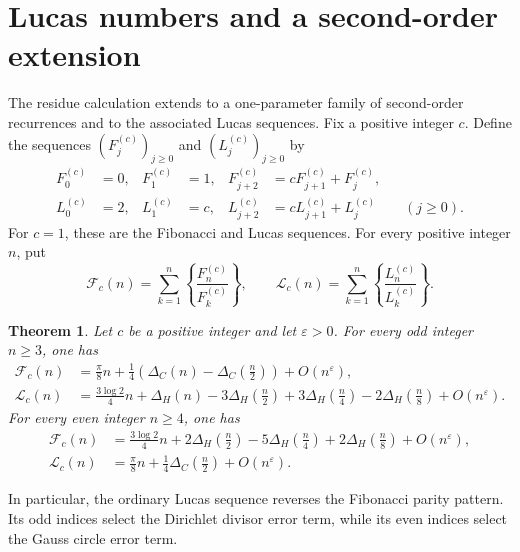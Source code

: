 \documentclass[11pt]{article}
\newtheorem{theorem}{Theorem}[section]
\newcommand{\FF}{\mathcal F}
\newcommand{\LL}{\mathcal L}
\newcommand{\eps}{\varepsilon}
\begin{document}
\section{Lucas numbers and a second-order extension}

The residue calculation extends to a one-parameter family of second-order
recurrences and to the associated Lucas sequences. Fix a positive integer
$c$. Define the sequences
$(F_j^{(c)})_{j\geq 0}$ and
$(L_j^{(c)})_{j\geq 0}$ by
\begin{align*}
 F_0^{(c)}&=0,&F_1^{(c)}&=1,&
 F_{j+2}^{(c)}&=cF_{j+1}^{(c)}+F_j^{(c)},\\
 L_0^{(c)}&=2,&L_1^{(c)}&=c,&
 L_{j+2}^{(c)}&=cL_{j+1}^{(c)}+L_j^{(c)}
 \qquad (j\geq 0).
\end{align*}
For $c=1$, these are the Fibonacci and Lucas sequences. For every positive
integer $n$, put
\[
 \FF_c(n)=\sum_{k=1}^{n}\left\{\frac{F_n^{(c)}}{F_k^{(c)}}\right\},
 \qquad
 \LL_c(n)=\sum_{k=1}^{n}\left\{\frac{L_n^{(c)}}{L_k^{(c)}}\right\}.
\]

\begin{theorem}\label{thm:second-order}
Let $c$ be a positive integer and let $\eps>0$. For every odd integer
$n\geq 3$, one has
\begin{align}
 \FF_c(n)&=\frac{\pi}{8}n
 +\frac14\left(\Delta_C(n)-\Delta_C\left(\frac n2\right)\right)
 +O(n^\eps),\label{eq:general-F-odd}\\
 \LL_c(n)&=\frac{3\log 2}{4}n
 +\Delta_H(n)-3\Delta_H\left(\frac n2\right)
 +3\Delta_H\left(\frac n4\right)-2\Delta_H\left(\frac n8\right)
 +O(n^\eps).\label{eq:general-L-odd}
\end{align}
For every even integer $n\geq 4$, one has
\begin{align}
 \FF_c(n)&=\frac{3\log 2}{4}n
 +2\Delta_H\left(\frac n2\right)-5\Delta_H\left(\frac n4\right)
 +2\Delta_H\left(\frac n8\right)+O(n^\eps),
 \label{eq:general-F-even}\\
 \LL_c(n)&=\frac{\pi}{8}n
 +\frac14\Delta_C\left(\frac n2\right)+O(n^\eps).
 \label{eq:general-L-even}
\end{align}
\end{theorem}

In particular, the ordinary Lucas sequence reverses the Fibonacci parity
pattern. Its odd indices select the Dirichlet divisor error term, while its
even indices select the Gauss circle error term.
\end{document}
